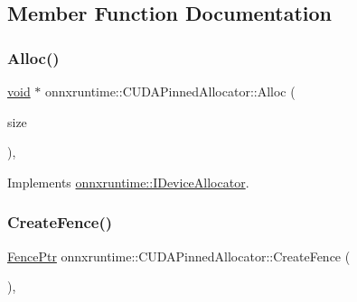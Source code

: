 \subsection{Member Function Documentation}
\mbox{\label{classonnxruntime_1_1CUDAPinnedAllocator_a22d04b010dc7782d37689ae50bab2535}} 
\subsubsection{\texorpdfstring{Alloc()}{Alloc()}}
{\footnotesize\ttfamily \mbox{\hyperlink{mlasi_8h_a88f941d423cb2a819b70a1358982b1a6}{void}} $\ast$ onnxruntime\+::\+C\+U\+D\+A\+Pinned\+Allocator\+::\+Alloc (\begin{DoxyParamCaption}\item[{\mbox{\hyperlink{mlasi_8h_a503efbc1c6e50825320ad909366b78ab}{size\+\_\+t}}}]{size }\end{DoxyParamCaption})\hspace{0.3cm}{\ttfamily [override]}, {\ttfamily [virtual]}}



Implements \mbox{\hyperlink{classonnxruntime_1_1IDeviceAllocator_aa703af32705cabad8c9f69e60efcfb6b}{onnxruntime\+::\+I\+Device\+Allocator}}.

\mbox{\label{classonnxruntime_1_1CUDAPinnedAllocator_ac484f5708f516cc19cc788404e173367}} 
\subsubsection{\texorpdfstring{Create\+Fence()}{CreateFence()}}
{\footnotesize\ttfamily \mbox{\hyperlink{namespaceonnxruntime_a42d52aa37e4dba8c02178f81eda99eeb}{Fence\+Ptr}} onnxruntime\+::\+C\+U\+D\+A\+Pinned\+Allocator\+::\+Create\+Fence (\begin{DoxyParamCaption}\item[{const \mbox{\hyperlink{classonnxruntime_1_1SessionState}{Session\+State}} $\ast$}]{ }\end{DoxyParamCaption})\hspace{0.3cm}{\ttfamily [override]}, {\ttfamily [virtual]}}


